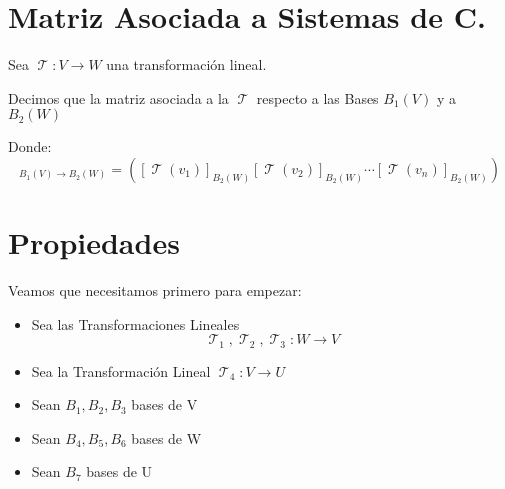 \documentclass[12pt]{report}                                    %
\DeclareMathOperator \LinealTransformation {\mathcal{T}}        %
\begin{document}
    \clearpage
    \section{Matriz Asociada a Sistemas de C.}
        Sea $\LinealTransformation : V \to W $ una transformación lineal.
        
        Decimos que la matriz asociada a la $\LinealTransformation$ respecto a las Bases 
        $B_{1}(V)$ y a $B_{2}(W)$

        Donde:
        \begin{equation*}
            [\LinealTransformation]_{B_{1}(V) \to B_{2}(W)} = 
            \left(
                [\LinealTransformation(v_1)]_{B_{2}(W)}
                [\LinealTransformation(v_2)]_{B_{2}(W)}
                \cdots
                [\LinealTransformation(v_n)]_{B_{2}(W)}
            \right)
        \end{equation*}


        \clearpage
        \section{Propiedades}

            Veamos que necesitamos primero para empezar:
            
            \begin{itemize}
                \item Sea las Transformaciones Lineales 
                    \begin{equation*}
                        \LinealTransformation_1,
                        \LinealTransformation_2,
                        \LinealTransformation_3 : W \to V
                    \end{equation*}

                \item Sea la Transformación Lineal $\LinealTransformation_4: V \to U$
                
                \item Sean $B_1, B_2, B_3$ bases de V
                
                \item Sean $B_4, B_5, B_6$ bases de W
                
                \item Sean $B_7$ bases de U
            \end{itemize}
\end{document}
